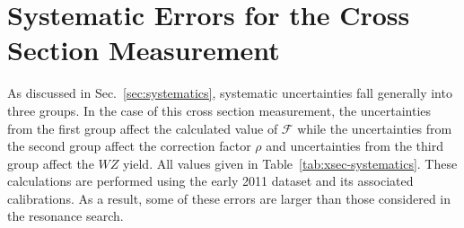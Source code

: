 \section{Systematic Errors for the Cross Section Measurement}

As discussed in Sec.~\ref{sec:systematics}, systematic uncertainties fall generally into three groups.  In the case of this cross section measurement, the uncertainties from the first group affect the calculated value of $\mathcal{F}$ while the uncertainties from the second group affect the correction factor $\rho$ and uncertainties from the third group affect the $WZ$ yield.  All values given in Table~\ref{tab:xsec-systematics}.  These calculations are performed using the early 2011 dataset and its associated calibrations.  As a result, some of these errors are larger than those considered in the resonance search.

